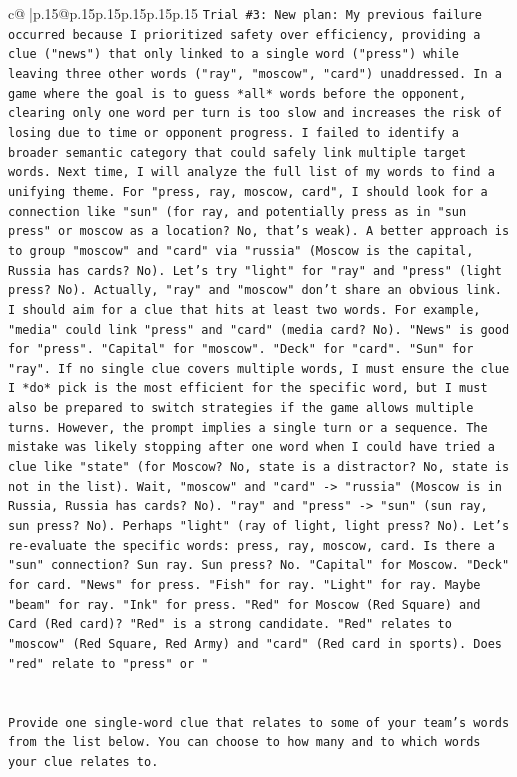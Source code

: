 \documentclass{article}
\begin{document}
{\begin{supertabular}{c@{$\;$}|p{.15\linewidth}@{}p{.15\linewidth}p{.15\linewidth}p{.15\linewidth}p{.15\linewidth}p{.15\linewidth}}
{{{\texttt{Trial \#3: New plan: My previous failure occurred because I prioritized safety over efficiency, providing a clue ("news") that only linked to a single word ("press") while leaving three other words ("ray", "moscow", "card") unaddressed. In a game where the goal is to guess *all* words before the opponent, clearing only one word per turn is too slow and increases the risk of losing due to time or opponent progress. I failed to identify a broader semantic category that could safely link multiple target words. Next time, I will analyze the full list of my words to find a unifying theme. For "press, ray, moscow, card", I should look for a connection like "sun" (for ray, and potentially press as in "sun press" or moscow as a location? No, that's weak). A better approach is to group "moscow" and "card" via "russia" (Moscow is the capital, Russia has cards? No). Let's try "light" for "ray" and "press" (light press? No). Actually, "ray" and "moscow" don't share an obvious link. I should aim for a clue that hits at least two words. For example, "media" could link "press" and "card" (media card? No). "News" is good for "press". "Capital" for "moscow". "Deck" for "card". "Sun" for "ray". If no single clue covers multiple words, I must ensure the clue I *do* pick is the most efficient for the specific word, but I must also be prepared to switch strategies if the game allows multiple turns. However, the prompt implies a single turn or a sequence. The mistake was likely stopping after one word when I could have tried a clue like "state" (for Moscow? No, state is a distractor? No, state is not in the list). Wait, "moscow" and "card" {-}> "russia" (Moscow is in Russia, Russia has cards? No). "ray" and "press" {-}> "sun" (sun ray, sun press? No). Perhaps "light" (ray of light, light press? No). Let's re{-}evaluate the specific words: press, ray, moscow, card. Is there a "sun" connection? Sun ray. Sun press? No. "Capital" for Moscow. "Deck" for card. "News" for press. "Fish" for ray. "Light" for ray. Maybe "beam" for ray. "Ink" for press. "Red" for Moscow (Red Square) and Card (Red card)? "Red" is a strong candidate. "Red" relates to "moscow" (Red Square, Red Army) and "card" (Red card in sports). Does "red" relate to "press" or "} \\
\\ 
\\ 
\texttt{Provide one single{-}word clue that relates to some of your team's words from the list below. You can choose to how many and to which words your clue relates to.} \\
}}}
\end{supertabular}}
\end{document}
